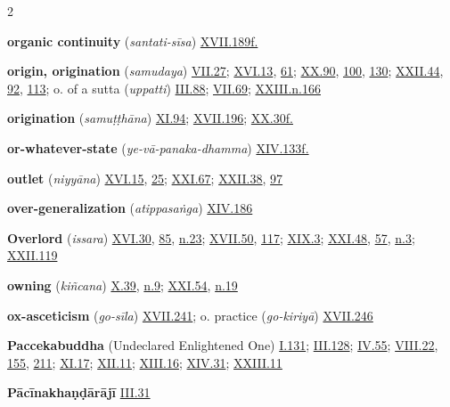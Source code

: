 \begin{multicols}{2}
\begin{vismHanging}
\par\textbf{organic continuity} (\emph{santati-sīsa}) \hyperlink{XVII.189}{XVII.189f.}{}
\par\textbf{origin, origination} (\emph{samudaya}) \hyperlink{VII.27}{VII.27}{}; \hyperlink{XVI.13}{XVI.13}{}, \hyperlink{XVI.61}{61}{}; \hyperlink{XX.90}{XX.90}{}, \hyperlink{XX.100}{100}{}, \hyperlink{XX.130}{130}{}; \hyperlink{XXII.44}{XXII.44}{}, \hyperlink{XXII.92}{92}{}, \hyperlink{XXII.113}{113}{}; o. of a sutta (\emph{uppatti}) \hyperlink{III.88}{III.88}{}; \hyperlink{VII.69}{VII.69}{}; \hyperlink{XXIII.n166}{XXIII.n.166}{}
\par\textbf{origination} (\emph{samuṭṭhāna}) \hyperlink{XI.94}{XI.94}{}; \hyperlink{XVII.196}{XVII.196}{}; \hyperlink{XX.30}{XX.30f.}{}
\par\textbf{or-whatever-state} (\emph{ye-vā-panaka-dhamma}) \hyperlink{XIV.133}{XIV.133f.}{}
\par\textbf{outlet} (\emph{niyyāna}) \hyperlink{XVI.15}{XVI.15}{}, \hyperlink{XVI.25}{25}{}; \hyperlink{XXI.67}{XXI.67}{}; \hyperlink{XXII.38}{XXII.38}{}, \hyperlink{XXII.97}{97}{}
\par\textbf{over-generalization} (\emph{atippasaṅga}) \hyperlink{XIV.186}{XIV.186}{}
\par\textbf{Overlord} (\emph{issara}) \hyperlink{XVI.30}{XVI.30}{}, \hyperlink{XVI.85}{85}{}, \hyperlink{XVI.n23}{n.23}{}; \hyperlink{XVII.50}{XVII.50}{}, \hyperlink{XVII.117}{117}{}; \hyperlink{XIX.3}{XIX.3}{}; \hyperlink{XXI.48}{XXI.48}{}, \hyperlink{XXI.57}{57}{}, \hyperlink{XXI.n3}{n.3}{}; \hyperlink{XXII.119}{XXII.119}{}
\par\textbf{owning} (\emph{kiñcana}) \hyperlink{X.39}{X.39}{}, \hyperlink{X.n9}{n.9}{}; \hyperlink{XXI.54}{XXI.54}{}, \hyperlink{XXI.n19}{n.19}{}
\par\textbf{ox-asceticism} (\emph{go-sīla}) \hyperlink{XVII.241}{XVII.241}{}; o. practice (\emph{go-kiriyā}) \hyperlink{XVII.246}{XVII.246}{}
\par\textbf{Paccekabuddha} (Undeclared Enlightened One) \hyperlink{I.131}{I.131}{}; \hyperlink{III.128}{III.128}{}; \hyperlink{IV.55}{IV.55}{}; \hyperlink{VIII.22}{VIII.22}{}, \hyperlink{VIII.155}{155}{}, \hyperlink{VIII.211}{211}{}; \hyperlink{XI.17}{XI.17}{}; \hyperlink{XII.11}{XII.11}{}; \hyperlink{XIII.16}{XIII.16}{}; \hyperlink{XIV.31}{XIV.31}{}; \hyperlink{XXIII.11}{XXIII.11}{}
\par\textbf{Pācīnakhaṇḍārājī} \hyperlink{III.31}{III.31}{}

\end{vismHanging}
\end{multicols}
